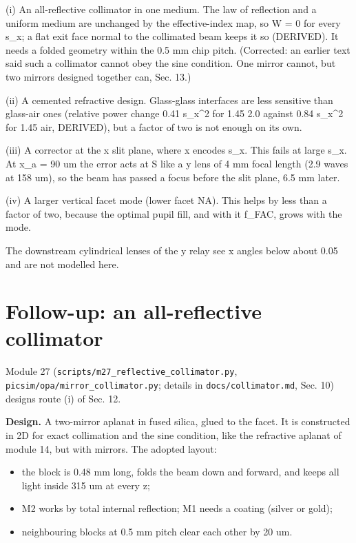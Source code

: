 (i) An all-reflective collimator in one medium. The law of reflection
and a uniform medium are unchanged by the effective-index map, so W = 0
for every s\_x; a flat exit face normal to the collimated beam keeps it
so (DERIVED). It needs a folded geometry within the 0.5 mm chip pitch.
(Corrected: an earlier text said such a collimator cannot obey the sine
condition. One mirror cannot, but two mirrors designed together can,
Sec. 13.)

(ii) A cemented refractive design. Glass-glass interfaces are less
sensitive than glass-air ones (relative power change 0.41 s\_x\^{}2 for
1.45 \textbar{} 2.0 against 0.84 s\_x\^{}2 for 1.45 \textbar{} air,
DERIVED), but a factor of two is not enough on its own.

(iii) A corrector at the x slit plane, where x encodes s\_x. This fails
at large s\_x. At x\_a = 90 um the error acts at S like a y lens of 4 mm
focal length (2.9 waves at 158 um), so the beam has passed a focus
before the slit plane, 6.5 mm later.

(iv) A larger vertical facet mode (lower facet NA). This helps by less
than a factor of two, because the optimal pupil fill, and with it
f\_FAC, grows with the mode.

The downstream cylindrical lenses of the y relay see x angles below
about 0.05 and are not modelled here.

\hypertarget{13-follow-up-an-all-reflective-collimator}{%
\section{Follow-up: an all-reflective
collimator}\label{megascale-13-follow-up-an-all-reflective-collimator}}

Module 27 (\texttt{scripts/m27\_reflective\_collimator.py},
\texttt{picsim/opa/mirror\_collimator.py}; details in
\texttt{docs/collimator.md}, Sec. 10) designs route (i) of Sec. 12.

\textbf{Design.} A two-mirror aplanat in fused silica, glued to the
facet. It is constructed in 2D for exact collimation and the sine
condition, like the refractive aplanat of module 14, but with mirrors.
The adopted layout:

\begin{itemize}
\tightlist
\item
  the block is 0.48 mm long, folds the beam down and forward, and keeps
  all light inside 315 um at every z;
\item
  M2 works by total internal reflection; M1 needs a coating (silver or
  gold);
\item
  neighbouring blocks at 0.5 mm pitch clear each other by 20 um.
\end{itemize}

